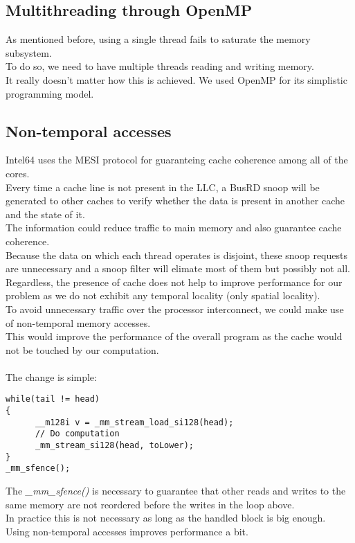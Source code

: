 \documentclass[10pt, fleqn]{article}
\begin{document}
\subsection{Multithreading through OpenMP}
As mentioned before, using a single thread fails to saturate the memory subsystem.\\
To do so, we need to have multiple threads reading and writing memory.\\
It really doesn't matter how this is achieved. We used OpenMP for its simplistic programming model.

\subsection{Non-temporal accesses}
Intel64 uses the MESI protocol for guaranteing cache coherence among all of the cores.\\
Every time a cache line is not present in the LLC, a BusRD snoop will be generated to other caches to verify whether the data is present in another cache and the state of it.\\
The information could reduce traffic to main memory and also guarantee cache coherence.\\
Because the data on which each thread operates is disjoint, these snoop requests are unnecessary and a snoop filter will elimate most of them but possibly not all.\\
Regardless, the presence of cache does not help to improve performance for our problem as we do not exhibit any temporal locality (only spatial locality).\\
To avoid unnecessary traffic over the processor interconnect, we could make use of non-temporal memory accesses.\\
This would improve the performance of the overall program as the cache would not be touched by our computation.\\\\
The change is simple:\\
\begin{lstlisting}
while(tail != head)
{
      __m128i v = _mm_stream_load_si128(head);
      // Do computation
      _mm_stream_si128(head, toLower);
}
_mm_sfence();
\end{lstlisting}
The \textit{\_mm\_sfence()} is necessary to guarantee that other reads and writes to the same memory are not reordered before the writes in the loop above.\\
In practice this is not necessary as long as the handled block is big enough.\\
Using non-temporal accesses improves performance a bit.
\end{document}
